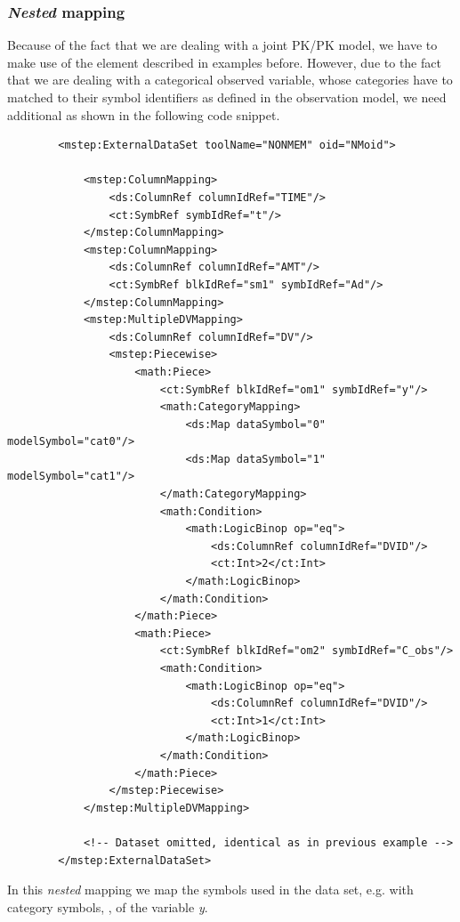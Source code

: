 \subsubsection{\emph{Nested} mapping}
Because of the fact that we are dealing with a joint PK/PK model, we have to 
make use of the  element described in examples before.
However, due to the fact that we are dealing with a categorical observed variable, 
whose categories have to matched to their symbol identifiers as defined in the observation
model, we need additional  as shown in the following 
code snippet. 
\lstset{language=XML}
\begin{lstlisting}
        <mstep:ExternalDataSet toolName="NONMEM" oid="NMoid">
            
            <mstep:ColumnMapping>
                <ds:ColumnRef columnIdRef="TIME"/>
                <ct:SymbRef symbIdRef="t"/>
            </mstep:ColumnMapping>
            <mstep:ColumnMapping>
                <ds:ColumnRef columnIdRef="AMT"/>
                <ct:SymbRef blkIdRef="sm1" symbIdRef="Ad"/>
            </mstep:ColumnMapping>
            <mstep:MultipleDVMapping>
                <ds:ColumnRef columnIdRef="DV"/>
                <mstep:Piecewise>
                    <math:Piece>
                        <ct:SymbRef blkIdRef="om1" symbIdRef="y"/>
                        <math:CategoryMapping>
                            <ds:Map dataSymbol="0" modelSymbol="cat0"/>
                            <ds:Map dataSymbol="1" modelSymbol="cat1"/>
                        </math:CategoryMapping>
                        <math:Condition>
                            <math:LogicBinop op="eq">
                                <ds:ColumnRef columnIdRef="DVID"/>
                                <ct:Int>2</ct:Int>
                            </math:LogicBinop>
                        </math:Condition>
                    </math:Piece>
                    <math:Piece>
                        <ct:SymbRef blkIdRef="om2" symbIdRef="C_obs"/>
                        <math:Condition>
                            <math:LogicBinop op="eq">
                                <ds:ColumnRef columnIdRef="DVID"/>
                                <ct:Int>1</ct:Int>
                            </math:LogicBinop>
                        </math:Condition>
                    </math:Piece>
                </mstep:Piecewise>
            </mstep:MultipleDVMapping>
            
            <!-- Dataset omitted, identical as in previous example -->
        </mstep:ExternalDataSet>
\end{lstlisting}
In this \emph{nested} mapping we map the symbols used in the data set,
e.g.  with category symbols, ,
of the variable \emph{y}.


